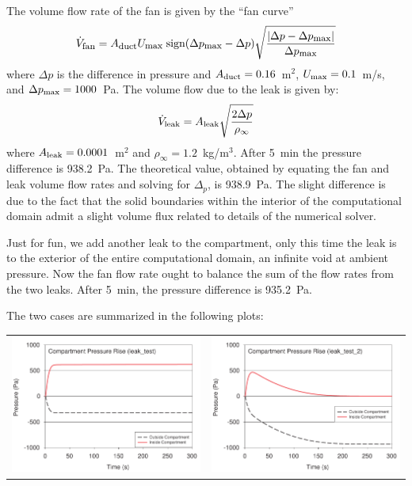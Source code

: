 \documentclass[11pt]{book}
\newcommand{\be}{\begin{equation}}
\newcommand{\ee}{\end{equation}}
\begin{document}
The volume flow rate of the fan is given by the ``fan curve''
\be \dot{V}_{\hbox{\footnotesize fan}} = A_{\hbox{\footnotesize duct}} U_{\hbox{\footnotesize max}} \;
   \hbox{sign} (\Delta p_{\hbox{\footnotesize max}}-\Delta p)
   \sqrt{ \frac{ |\Delta p - \Delta p_{\hbox{\footnotesize max}}|}{\Delta p_{\hbox{\footnotesize max}} } }  \ee
where $\Delta p$ is the difference in pressure and $A_{\hbox{\scriptsize duct}}=0.16$~m$^2$, $U_{\hbox{\scriptsize max}}=0.1$~m/s, and $\Delta p_{\hbox{\scriptsize max}}=1000$~Pa.
The volume flow due to the leak is given by:
\be \dot{V}_{\hbox{\scriptsize leak}} = A_{\hbox{\scriptsize leak}} \sqrt{ \frac{ 2 \Delta p}{ \rho_\infty} } \ee
where $A_{\hbox{\scriptsize leak}}=0.0001$~m$^2$ and $\rho_\infty=1.2$~kg/m$^3$.
After 5~min the pressure difference is 938.2~Pa. The theoretical value, obtained by equating the fan and leak volume flow rates and solving for $\Delta_p$, is 938.9~Pa. The
slight difference is due to the fact that the solid boundaries within the interior of the computational domain admit a slight volume flux related to details of the
numerical solver.

Just for fun, we add another leak to the compartment, only this time the leak is to the exterior of the entire computational domain, an infinite void at ambient pressure.
Now the fan flow rate ought to balance the sum of the flow rates from the two leaks. After 5~min, the pressure difference is 935.2~Pa.

The two cases are summarized in the following plots:

\vspace{0.1in}
\noindent
\begin{tabular*}{\textwidth}{lr}
\includegraphics[width=3.1in]{FIGURES/leak_test_Pressure_Case_1} &
\includegraphics[width=3.1in]{FIGURES/leak_test_Pressure_Case_2}
\end{tabular*}
\end{document}
